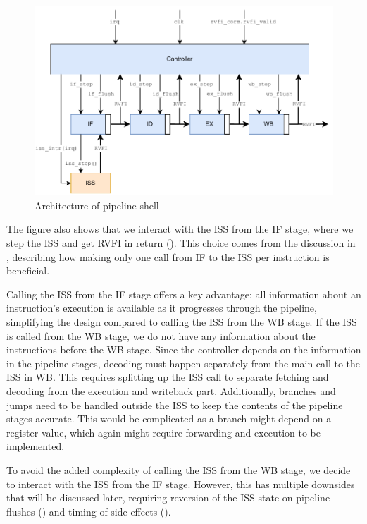 \begin{figure}
    \centering
    \includegraphics[width=0.75\linewidth]{figures/Pipeline_shell.pdf}
    \caption{Architecture of pipeline shell}
    \label{fig:pipeline_shell}
\end{figure}


The figure also shows that we interact with the ISS from the IF stage, where we step the ISS and get RVFI in return (). This choice comes from the discussion in , describing how making only one call from IF to the ISS per instruction is beneficial. 

Calling the ISS from the IF stage offers a key advantage: all information about an instruction's execution is available as it progresses through the pipeline, simplifying the design compared to calling the ISS from the WB stage. If the ISS is called from the WB stage, we do not have any information about the instructions before the WB stage. Since the controller depends on the information in the pipeline stages, decoding must happen separately from the main call to the ISS in WB. This requires splitting up the ISS call to separate fetching and decoding from the execution and writeback part. Additionally, branches and jumps need to be handled outside the ISS to keep the contents of the pipeline stages accurate. This would be complicated as a branch might depend on a register value, which again might require forwarding and execution to be implemented.

To avoid the added complexity of calling the ISS from the WB stage, we decide to interact with the ISS from the IF stage. However, this has multiple downsides that will be discussed later, requiring reversion of the ISS state on pipeline flushes () and timing of side effects ().
%
%
%



